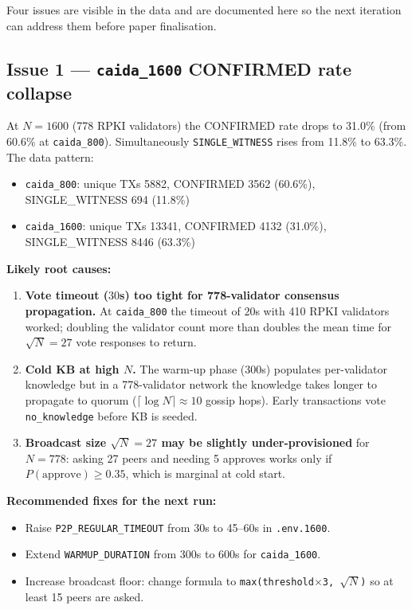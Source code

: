 \documentclass[10pt,a4paper]{article}
\begin{document}
Four issues are visible in the data and are documented here so the next
iteration can address them before paper finalisation.

\subsection{Issue 1 --- \texttt{caida\_1600} CONFIRMED rate collapse}

At $N=1600$ (778 RPKI validators) the CONFIRMED rate drops to 31.0\%
(from 60.6\% at \texttt{caida\_800}). Simultaneously \texttt{SINGLE\_WITNESS}
rises from 11.8\% to 63.3\%. The data pattern:

\begin{itemize}
\item \texttt{caida\_800}: unique TXs 5882, CONFIRMED 3562 (60.6\%), SINGLE\_WITNESS 694 (11.8\%)
\item \texttt{caida\_1600}: unique TXs 13341, CONFIRMED 4132 (31.0\%), SINGLE\_WITNESS 8446 (63.3\%)
\end{itemize}

\textbf{Likely root causes:}

\begin{enumerate}
\item \textbf{Vote timeout ($30$s) too tight for 778-validator consensus propagation.} At \texttt{caida\_800} the timeout of $20$s with 410 RPKI validators worked; doubling the validator count more than doubles the mean time for $\sqrt{N}=27$ vote responses to return.
\item \textbf{Cold KB at high $N$.} The warm-up phase ($300$s) populates per-validator knowledge but in a 778-validator network the knowledge takes longer to propagate to quorum ($\lceil \log N \rceil \approx 10$ gossip hops). Early transactions vote \texttt{no\_knowledge} before KB is seeded.
\item \textbf{Broadcast size $\sqrt{N}=27$ may be slightly under-provisioned} for $N=778$: asking 27 peers and needing 5 approves works only if $P(\text{approve}) \geq 0.35$, which is marginal at cold start.
\end{enumerate}

\textbf{Recommended fixes for the next run:}
\begin{itemize}
\item Raise \texttt{P2P\_REGULAR\_TIMEOUT} from 30s to 45--60s in \texttt{.env.1600}.
\item Extend \texttt{WARMUP\_DURATION} from 300s to 600s for \texttt{caida\_1600}.
\item Increase broadcast floor: change formula to \texttt{max(threshold$\times$3, $\sqrt{N}$)} so at least 15 peers are asked.
\end{itemize}
\end{document}
